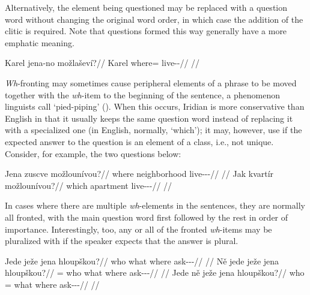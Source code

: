 Alternatively, the element being questioned may be replaced with a question word
without changing the original word order, in which case the addition of the
clitic  is required. Note that questions formed this way generally have
a more emphatic meaning.

\pex
\begingl
\gla Karel jena-no možlaševí?//
\glb Karel where=\Q{} live-\Av{}-\Cont{}//
\glft {}//
\endgl
\xe


\emph{Wh}-fronting may sometimes cause peripheral elements of a phrase to be
moved together with the \emph{wh}-item to the beginning of the sentence, a
phenomenon linguists call `pied-piping' (\cite[263-4]{ross1967}). When this
occurs, Iridian is more conservative than English in that it usually keeps the
same question word instead of replacing it with a specialized one (in English,
normally, `which'); it may, however, use  if the expected
answer to the question is an element of a class, i.e., not unique. Consider, for
example, the two questions below:

\pex
\a
\begingl
\gla Jena zuscve možlounívou?//
\glb where neighborhood live-\Lv{}-\Cont{}-\Nz{}//
\glft {}//
\endgl
\a
\begingl
\gla Jak kvartír možlounívou?//
\glb which apartment live-\Lv{}-\Cont{}-\Nz{}//
\glft {}//
\endgl
\xe

In cases where there are multiple \emph{wh}-elements in the sentences, they are
normally all fronted, with the main question word first followed by the rest in
order of importance. Interestingly, too, any or all of the fronted
\emph{wh}-items may be pluralized with  if the speaker expects that the
answer is plural.

\pex
\a\begingl
\gla Jede ježe jena hloupškou?//
\glb who what where ask-\Av{}-\Pf{}-\Nz{}//
\glft {}//
\endgl
\a\begingl
\gla Ně jede ježe jena hloupškou?//
\glb \Pl{}= who what where ask-\Av{}-\Pf{}-\Nz{}//
\glft {}//
\endgl
\a\begingl
\gla Jede ně ježe jena hloupškou?//
\glb who \Pl{}= what where ask-\Av{}-\Pf{}-\Nz{}//
\glft {}//
\endgl
\xe

